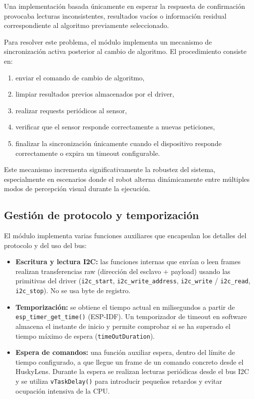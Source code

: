 \documentclass{prgrado}
\begin{document}
Una implementación basada únicamente en esperar la respuesta de confirmación
provocaba lecturas inconsistentes, resultados vacíos o información residual
correspondiente al algoritmo previamente seleccionado.

Para resolver este problema, el módulo implementa un mecanismo de sincronización
activa posterior al cambio de algoritmo. El procedimiento consiste en:

\begin{enumerate}
    \item enviar el comando de cambio de algoritmo,
    \item limpiar resultados previos almacenados por el driver,
    \item realizar requests periódicos al sensor,
    \item verificar que el sensor responde correctamente a nuevas peticiones,
    \item finalizar la sincronización únicamente cuando el dispositivo responde correctamente o expira un timeout configurable.
\end{enumerate}

Este mecanismo incrementa significativamente la robustez del sistema,
especialmente en escenarios donde el robot alterna dinámicamente entre múltiples
modos de percepción visual durante la ejecución.

\subsection{Gestión de protocolo y temporización}

El módulo implementa varias funciones auxiliares que encapsulan los detalles del protocolo y del uso del bus:

\begin{itemize}[noitemsep]
  \item \textbf{Escritura y lectura I2C:} las funciones internas que envían o leen frames realizan transferencias raw (dirección del esclavo + payload) usando las primitivas del driver (\texttt{i2c\_start}, \texttt{i2c\_write\_address}, \texttt{i2c\_write} / \texttt{i2c\_read}, \texttt{i2c\_stop}). No se usa byte de registro.
  \item \textbf{Temporización:} se obtiene el tiempo actual en milisegundos a partir de \texttt{esp\_timer\_get\_time()} (ESP-IDF). Un temporizador de timeout en software almacena el instante de inicio y permite comprobar si se ha superado el tiempo máximo de espera (\texttt{timeOutDuration}).
  \item \textbf{Espera de comandos:} una función auxiliar espera, dentro del límite de tiempo configurado, a que llegue un frame de un comando concreto desde el HuskyLens. Durante la espera se realizan lecturas periódicas desde el bus I2C y se utiliza \texttt{vTaskDelay()} para introducir pequeños retardos y evitar ocupación intensiva de la CPU.
\end{itemize}
\end{document}
